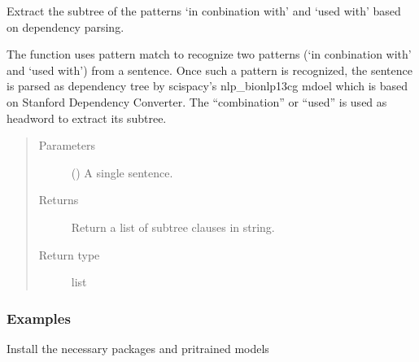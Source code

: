 \documentclass[letterpaper,10pt,english]{sphinxmanual}
\begin{document}
\begin{fulllineitems}
\label{\detokenize{biomarker_extraction:biomarker_extraction.sent_subtree}}
\sphinxAtStartPar
Extract the subtree of the patterns ‘in conbination with’ and ‘used with’ based on dependency parsing.

\sphinxAtStartPar
The function uses pattern match to recognize two patterns (‘in conbination with’ and ‘used with’) from a sentence. Once such a pattern is recognized, the sentence is parsed as dependency tree by scispacy’s nlp\_bionlp13cg mdoel which is based on Stanford Dependency Converter. The “combination” or “used” is used as headword to extract its subtree.
\begin{quote}\begin{description}
\item[{Parameters}] \leavevmode
\sphinxAtStartPar
{} () \textendash{} A single sentence.

\item[{Returns}] \leavevmode
\sphinxAtStartPar
Return a list of subtree clauses in string.

\item[{Return type}] \leavevmode
\sphinxAtStartPar
list

\end{description}\end{quote}
\subsubsection*{Examples}

\sphinxAtStartPar
Install the necessary packages and pri\sphinxhyphen{}trained models

\begin{sphinxVerbatim}[commandchars=\\\{\}]
\end{sphinxVerbatim}


\end{fulllineitems}
\end{document}
